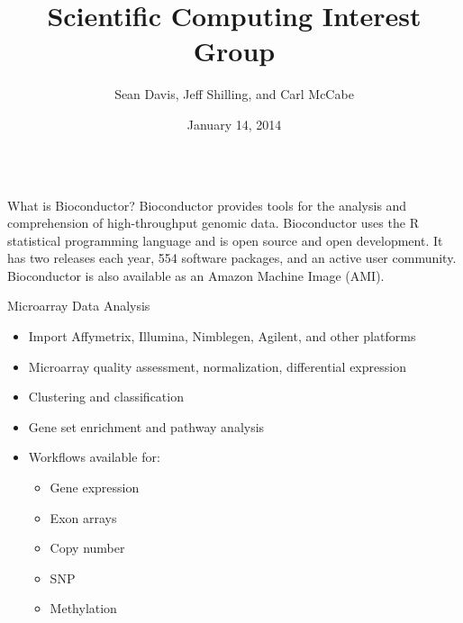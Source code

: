 \documentclass[final]{beamer}
\title{Scientific Computing Interest Group}
\author{Sean Davis, Jeff Shilling, and Carl McCabe}
\date{January 14, 2014}
\begin{document}
\begin{frame}[t]
  \begin{columns}[t]

    \begin{column}{0.3\linewidth}
      \begin{block}{What is Bioconductor?}
        Bioconductor provides tools for the analysis and comprehension of high-throughput genomic data. Bioconductor uses the R statistical programming language and is open source and open development. It has two releases each year, 554 software packages, and an active user community. Bioconductor is also available as an Amazon Machine Image (AMI).
      \end{block}
      \begin{block}{Microarray Data Analysis}
        \begin{itemize}
        \item{Import Affymetrix, Illumina, Nimblegen, Agilent, and other platforms}
        \item{Microarray quality assessment, normalization, differential expression}
        \item{Clustering and classification}
        \item{Gene set enrichment and pathway analysis}
        \item{Workflows available for:}
     \begin{itemize}
       \item{Gene expression}
       \item{Exon arrays}
       \item{Copy number}
       \item{SNP}
       \item{Methylation}
     \end{itemize}
        \end{itemize}
      \end{block}
    \end{column}


\end{columns}
\end{frame}
\end{document}
